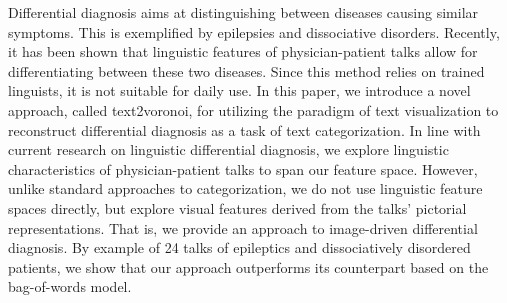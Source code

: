 Differential diagnosis aims at distinguishing between diseases causing similar symptoms. This is exemplified by epilepsies and dissociative disorders. Recently, it has been shown that linguistic features of physician-patient talks allow for differentiating between these two diseases. Since this method relies on trained linguists, it is not suitable for daily use. In this paper, we introduce a novel approach, called text2voronoi, for utilizing the paradigm of text visualization to reconstruct differential diagnosis as a task of text categorization. In line with current research on linguistic differential diagnosis, we explore linguistic characteristics of physician-patient talks to span our feature space. However, unlike standard approaches to categorization, we do not use linguistic feature spaces directly, but explore visual features derived from the talks' pictorial representations. That is, we provide an approach to image-driven differential diagnosis. By example of 24 talks of epileptics and dissociatively disordered patients, we show that our approach outperforms its counterpart based on the bag-of-words model.

